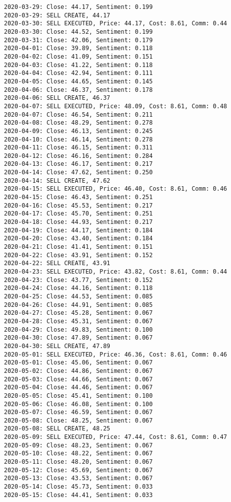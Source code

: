 \documentclass[11pt]{article}
\begin{document}
\begin{Verbatim}[commandchars=\\\{\}]
2020-03-29: Close: 44.17, Sentiment: 0.199
2020-03-29: SELL CREATE, 44.17
2020-03-30: SELL EXECUTED, Price: 44.17, Cost: 8.61, Comm: 0.44
2020-03-30: Close: 44.52, Sentiment: 0.199
2020-03-31: Close: 42.06, Sentiment: 0.179
2020-04-01: Close: 39.89, Sentiment: 0.118
2020-04-02: Close: 41.09, Sentiment: 0.151
2020-04-03: Close: 41.22, Sentiment: 0.118
2020-04-04: Close: 42.94, Sentiment: 0.111
2020-04-05: Close: 44.65, Sentiment: 0.145
2020-04-06: Close: 46.37, Sentiment: 0.178
2020-04-06: SELL CREATE, 46.37
2020-04-07: SELL EXECUTED, Price: 48.09, Cost: 8.61, Comm: 0.48
2020-04-07: Close: 46.54, Sentiment: 0.211
2020-04-08: Close: 48.29, Sentiment: 0.278
2020-04-09: Close: 46.13, Sentiment: 0.245
2020-04-10: Close: 46.14, Sentiment: 0.278
2020-04-11: Close: 46.15, Sentiment: 0.311
2020-04-12: Close: 46.16, Sentiment: 0.284
2020-04-13: Close: 46.17, Sentiment: 0.217
2020-04-14: Close: 47.62, Sentiment: 0.250
2020-04-14: SELL CREATE, 47.62
2020-04-15: SELL EXECUTED, Price: 46.40, Cost: 8.61, Comm: 0.46
2020-04-15: Close: 46.43, Sentiment: 0.251
2020-04-16: Close: 45.53, Sentiment: 0.217
2020-04-17: Close: 45.70, Sentiment: 0.251
2020-04-18: Close: 44.93, Sentiment: 0.217
2020-04-19: Close: 44.17, Sentiment: 0.184
2020-04-20: Close: 43.40, Sentiment: 0.184
2020-04-21: Close: 41.41, Sentiment: 0.151
2020-04-22: Close: 43.91, Sentiment: 0.152
2020-04-22: SELL CREATE, 43.91
2020-04-23: SELL EXECUTED, Price: 43.82, Cost: 8.61, Comm: 0.44
2020-04-23: Close: 43.77, Sentiment: 0.152
2020-04-24: Close: 44.16, Sentiment: 0.118
2020-04-25: Close: 44.53, Sentiment: 0.085
2020-04-26: Close: 44.91, Sentiment: 0.085
2020-04-27: Close: 45.28, Sentiment: 0.067
2020-04-28: Close: 45.31, Sentiment: 0.067
2020-04-29: Close: 49.83, Sentiment: 0.100
2020-04-30: Close: 47.89, Sentiment: 0.067
2020-04-30: SELL CREATE, 47.89
2020-05-01: SELL EXECUTED, Price: 46.36, Cost: 8.61, Comm: 0.46
2020-05-01: Close: 45.06, Sentiment: 0.067
2020-05-02: Close: 44.86, Sentiment: 0.067
2020-05-03: Close: 44.66, Sentiment: 0.067
2020-05-04: Close: 44.46, Sentiment: 0.067
2020-05-05: Close: 45.41, Sentiment: 0.100
2020-05-06: Close: 46.08, Sentiment: 0.100
2020-05-07: Close: 46.59, Sentiment: 0.067
2020-05-08: Close: 48.25, Sentiment: 0.067
2020-05-08: SELL CREATE, 48.25
2020-05-09: SELL EXECUTED, Price: 47.44, Cost: 8.61, Comm: 0.47
2020-05-09: Close: 48.23, Sentiment: 0.067
2020-05-10: Close: 48.22, Sentiment: 0.067
2020-05-11: Close: 48.20, Sentiment: 0.067
2020-05-12: Close: 45.69, Sentiment: 0.067
2020-05-13: Close: 43.53, Sentiment: 0.067
2020-05-14: Close: 45.73, Sentiment: 0.033
2020-05-15: Close: 44.41, Sentiment: 0.033

\end{Verbatim}
\end{document}
